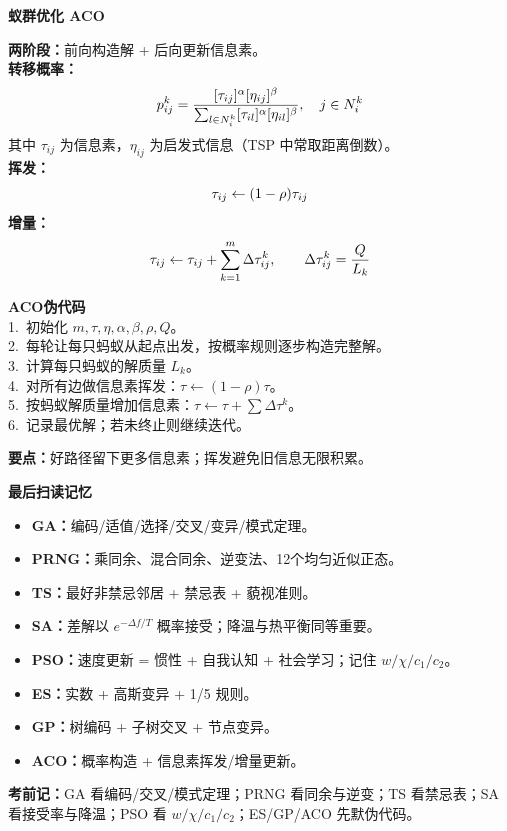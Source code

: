 \documentclass[8pt,a4paper]{ctexart}
\newcommand{\blk}[1]{%
  \par\needspace{2.2\baselineskip}%
  \vspace{1pt}\noindent
  \colorbox{black!10}{\parbox{\dimexpr\columnwidth-2\fboxsep\relax}{\textbf{#1}}}\par
  \vspace{1pt}}
\newcommand{\tightmath}[1]{\[
\vspace{-5pt}#1\vspace{-5pt}
\]}
\newcommand{\codebox}[1]{\begin{tcolorbox}#1\end{tcolorbox}}
\begin{document}
\begin{multicols*}{3}
\blk{蚁群优化 ACO}
\textbf{两阶段：}前向构造解 + 后向更新信息素。\\
\textbf{转移概率：}
\tightmath{
p_{ij}^k=
\frac{[\tau_{ij}]^\alpha[\eta_{ij}]^\beta}
{\sum_{l\in N_i^k}[\tau_{il}]^\alpha[\eta_{il}]^\beta},\quad j\in N_i^k}
其中 $\tau_{ij}$ 为信息素，$\eta_{ij}$ 为启发式信息（TSP 中常取距离倒数）。\\
\textbf{挥发：}
\tightmath{\tau_{ij}\leftarrow (1-\rho)\tau_{ij}}
\textbf{增量：}
\tightmath{\tau_{ij}\leftarrow \tau_{ij}+\sum_{k=1}^m\Delta\tau_{ij}^k,\qquad
\Delta\tau_{ij}^k=\frac{Q}{L_k}}
\codebox{
\textbf{ACO伪代码}\\
1.\ 初始化 $m,\tau,\eta,\alpha,\beta,\rho,Q$。\\
2.\ 每轮让每只蚂蚁从起点出发，按概率规则逐步构造完整解。\\
3.\ 计算每只蚂蚁的解质量 $L_k$。\\
4.\ 对所有边做信息素挥发：$\tau\leftarrow(1-\rho)\tau$。\\
5.\ 按蚂蚁解质量增加信息素：$\tau\leftarrow\tau+\sum\Delta\tau^k$。\\
6.\ 记录最优解；若未终止则继续迭代。
}
\textbf{要点：}好路径留下更多信息素；挥发避免旧信息无限积累。

\blk{最后扫读记忆}
\begin{itemize}
\item \textbf{GA：}编码/适值/选择/交叉/变异/模式定理。
\item \textbf{PRNG：}乘同余、混合同余、逆变法、12个均匀近似正态。
\item \textbf{TS：}最好非禁忌邻居 + 禁忌表 + 藐视准则。
\item \textbf{SA：}差解以 $e^{-\Delta f/T}$ 概率接受；降温与热平衡同等重要。
\item \textbf{PSO：}速度更新 = 惯性 + 自我认知 + 社会学习；记住 $w/\chi/c_1/c_2$。
\item \textbf{ES：}实数 + 高斯变异 + 1/5 规则。
\item \textbf{GP：}树编码 + 子树交叉 + 节点变异。
\item \textbf{ACO：}概率构造 + 信息素挥发/增量更新。
\end{itemize}
\textbf{考前记：}GA 看编码/交叉/模式定理；PRNG 看同余与逆变；TS 看禁忌表；SA 看接受率与降温；PSO 看 $w/\chi/c_1/c_2$；ES/GP/ACO 先默伪代码。

\end{multicols*}
\end{document}
